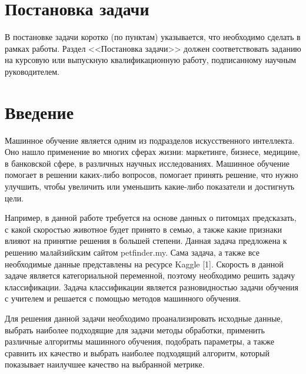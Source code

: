 \documentclass[14pt]{mmcs_article}
\begin{document}

\renewcommand{\contentsname}{Оглавление}

\tableofcontents

\newpage
{}

\section*{Постановка задачи}


В постановке задачи коротко (по пунктам) указывается, что необходимо сделать в рамках работы. Раздел <<Постановка задачи>> должен соответствовать заданию на курсовую или выпускную квалификационную работу, подписанному научным руководителем.


\newpage
{}
\section*{Введение}

Машинное обучение является одним из подразделов искусственного интеллекта. Оно нашло применение во многих сферах жизни: маркетинге, бизнесе, медицине, в банковской сфере, в различных научных исследованиях. Машинное обучение помогает в решении каких-либо вопросов, помогает принять решение, что нужно улучшить, чтобы увеличить или уменьшить какие-либо показатели и достигнуть цели. 

Например, в данной работе требуется на основе данных о питомцах предсказать, с какой скоростью животное будет принято в семью, а также какие признаки влияют на принятие решения в большей степени. Данная задача предложена к решению малайзийским сайтом petfinder.my. Сама задача, а также все необходимые данные представлены на ресурсе Kaggle [1]. Скорость в данной задаче является категориальной переменной, поэтому необходимо решить задачу классификации. Задача классификации является разновидностью задачи обучения с учителем и решается с помощью методов машинного обучения. 

Для решения данной задачи необходимо проанализировать исходные данные, выбрать наиболее подходящие для задачи методы обработки, применить различные алгоритмы машинного обучения, подобрать параметры, а также сравнить их качество и выбрать наиболее подходящий алгоритм, который показывает наилучшее качество на выбранной метрике.
\end{document}
